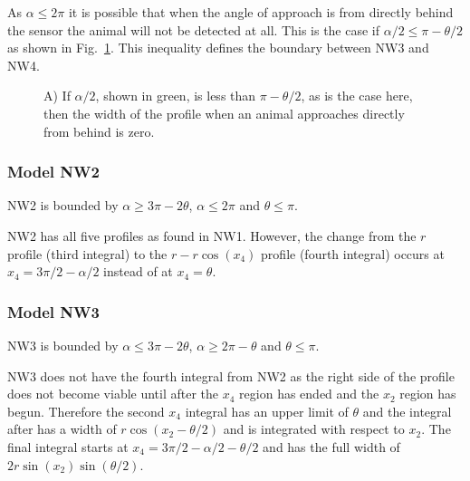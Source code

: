 As $\alpha \le 2\pi$ it is possible that when the angle of approach is from directly behind the sensor the animal will not be detected at all. This is the case if $\alpha/2\le \pi-\theta/2$ as shown in Fig.~\ref{f:NW2--4behind}. This inequality defines the boundary between NW3 and NW4.

\begin{figure}[t]
        \centering
        \begin{subfigure}[t]{0.4\textwidth}
                \centering
                \caption{}
                \label{f:NW2--4behind}
        \end{subfigure}

\caption{A) If $\alpha/2$, shown in green, is less than $\pi - \theta/2$, as is the case here, then the width of the profile when an animal approaches directly from behind is zero. }
\label{f:NW2--4}
\end{figure}


\subsubsection{Model NW2} \label{NW2}

NW2 is bounded by $\alpha \ge 3\pi - 2\theta$, $\alpha \le 2\pi$ and $\theta\le\pi$.

NW2 has all five profiles as found in NW1. However, the change from the $r$ profile (third integral) to the $r - r\cos(x_4)$ profile (fourth integral) occurs at $x_4 = 3\pi/2 - \alpha/2$ instead of at $x_4 = \theta$. 




\subsubsection{Model NW3} \label{NW3}

NW3 is bounded by $\alpha \le 3\pi - 2\theta$, $\alpha\ge 2\pi-\theta$ and $\theta\le\pi$.

NW3 does not have the fourth integral from NW2 as the right side of the profile does not become viable until after the $x_4$ region has ended and the $x_2$ region has begun. Therefore the second $x_4$ integral has an upper limit of $\theta $ and the integral after has a width of $r\cos(x_2 - \theta/2)$ and is integrated with respect to $x_2$. The final integral starts at $x_4 = 3\pi/2 - \alpha/2 - \theta/2$ and has the full width of $2r\sin(x_2)\sin(\theta/2)$.

